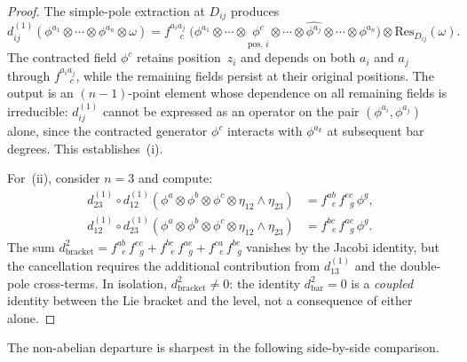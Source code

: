 \begin{proof}
The simple-pole extraction at $D_{ij}$ produces
\[
d_{ij}^{(1)}(\phi^{a_1} \otimes \cdots \otimes \phi^{a_n}
  \otimes \omega)
= f^{a_i a_j}_{\;\;\;\;c}\;
  \bigl(\phi^{a_1} \otimes \cdots \otimes
   \underset{\text{pos.\ }i}{\phi^c} \otimes \cdots
   \otimes \widehat{\phi^{a_j}} \otimes \cdots
   \otimes \phi^{a_n}\bigr)
  \otimes \mathrm{Res}_{D_{ij}}(\omega).
\]
The contracted field $\phi^c$ retains position~$z_i$ and depends on
both $a_i$ and $a_j$ through $f^{a_i a_j}_{\;\;\;\;c}$, while the
remaining fields persist at their original positions.  The output is
an $(n{-}1)$-point element whose dependence on all remaining fields
is irreducible: $d_{ij}^{(1)}$ cannot be expressed as an operator on
the pair $(\phi^{a_i}, \phi^{a_j})$ alone, since the contracted
generator $\phi^c$ interacts with $\phi^{a_k}$ at subsequent bar
degrees.  This establishes~(i).

For~(ii), consider $n = 3$ and compute:
\begin{align*}
d_{23}^{(1)} \circ d_{12}^{(1)}
  (\phi^a \otimes \phi^b \otimes \phi^c
  \otimes \eta_{12} \wedge \eta_{23})
&= f^{ab}_{\;\;e}\, f^{ec}_{\;\;g}\, \phi^g, \\
d_{12}^{(1)} \circ d_{23}^{(1)}
  (\phi^a \otimes \phi^b \otimes \phi^c
  \otimes \eta_{12} \wedge \eta_{23})
&= f^{bc}_{\;\;e}\, f^{ae}_{\;\;g}\, \phi^g.
\end{align*}
The sum $d_{\mathrm{bracket}}^2
= f^{ab}_{\;\;e}\, f^{ec}_{\;\;g}
+ f^{bc}_{\;\;e}\, f^{ae}_{\;\;g}
+ f^{ca}_{\;\;e}\, f^{be}_{\;\;g}$
vanishes by the Jacobi identity, but the cancellation requires the
additional contribution from $d_{13}^{(1)}$ and the double-pole
cross-terms.  In isolation, $d_{\mathrm{bracket}}^2 \neq 0$: the
identity $d_{\mathrm{bar}}^2 = 0$ is a \emph{coupled} identity
between the Lie bracket and the level, not a consequence of either
alone.
\end{proof}

The non-abelian departure is sharpest in the following side-by-side
comparison.

